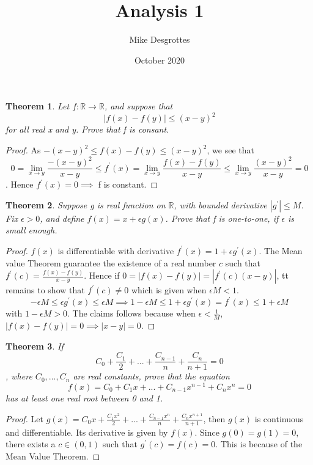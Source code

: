 \documentclass{article}
\title{Analysis 1}
\author{Mike Desgrottes}
\date{October 2020}
\theoremstyle{plain}
\newtheorem{theorem}{Theorem}
\theoremstyle{definition}
\begin{document}
\maketitle

\begin{theorem}
	Let $f: \mathbb{R} \to \mathbb{R}$, and suppose that $$|f(x) - f(y)| \leq (x - y)^{2} $$ for all real x and y. Prove that f is consant.
\end{theorem}

\begin{proof}
	As $-(x - y)^{2} \leq f(x) - f(y) \leq (x - y)^{2}$, we see that $$ 0  = \lim_{x \to y} \frac{-(x - y)^{2}}{x - y} \leq f^{'}(x) = \lim_{x \to y} \frac{f(x) - f(y)}{x - y} \leq \lim_{x \to y} \frac{(x - y)^{2}}{x - y} = 0$$.
	Hence $f^{'}(x) = 0 \implies $ f is constant.
\end{proof}

\begin{theorem}
	Suppose g is real function on $\mathbb{R}$, with bounded derivative $|g^{'}| \leq M$. Fix $\epsilon > 0$, and define $f(x) = x + \epsilon g(x)$. Prove that f is one-to-one, if $\epsilon$ is small enough.
\end{theorem}

\begin{proof}
	$f(x)$ is differentiable with derivative $f^{'}(x) = 1 + \epsilon g^{'}(x)$. The Mean value Theorem guarantee the existence of a real number $c$ such that $f^{'}(c) = \frac{f(x) - f(y)}{x - y}$. Hence if  $0 = |f(x) - f(y)| =|f^{'}(c)(x - y)| $, tt remains to show that $f^{'}(c) \not = 0$ which is given when $\epsilon M < 1$. $$- \epsilon M \leq \epsilon g^{'}(x) \leq \epsilon M \implies 1 - \epsilon M \leq 1 + \epsilon g^{'}(x) = f^{'}(x) \leq 1 + \epsilon M $$ with $1 - \epsilon M > 0$. The claims follows because when $\epsilon < \frac{1}{M}$, $|f(x) - f(y)| = 0 \implies |x - y| = 0$.
\end{proof}

\begin{theorem}
	If $$ C_{0} + \frac{C_{1}}{2} + ... + \frac{C_{n - 1}}{n} + \frac{C_{n}}{n + 1} = 0 $$, where $C_{0},...,C_{n}$ are real constants, prove that the equation $$f(x) = C_{0} + C_{1}x + ... + C_{n - 1}x^{n - 1} + C_{n}x^{n} = 0 $$ has at least one real root between 0 and 1.
\end{theorem}

\begin{proof}
	Let $g(x) = C_{0}x + \frac{C_{1}x^{2}}{2} + ... + \frac{C_{n - 1}x^{n}}{n} + \frac{C_{n}x^{n + 1}}{n + 1}$, then $g(x)$ is continuous and differentiable. Its derivative is given by $f(x)$. Since $g(0) = g(1) = 0$, there exists a $c \in (0,1)$ such that $g^{'}(c) = f(c) = 0$. This is because of the Mean Value Theorem. 
\end{proof}
\end{document}

